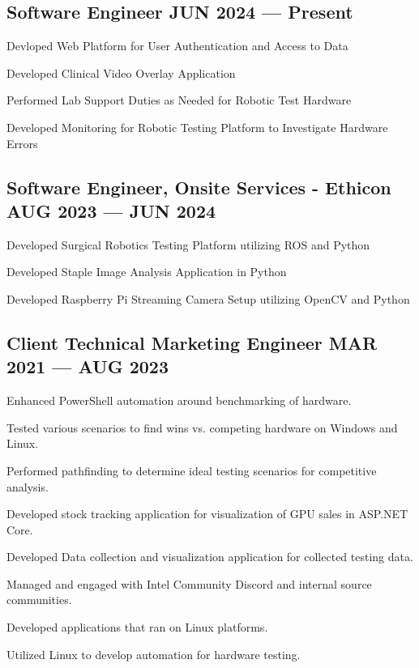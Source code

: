 \subsection{{Software Engineer \hfill JUN 2024 --- Present}}
\begin{zitemize}
\item Devloped Web Platform for User Authentication and Access to Data
\item Developed Clinical Video Overlay Application
\item Performed Lab Support Duties as Needed for Robotic Test Hardware
\item Developed Monitoring for Robotic Testing Platform to Investigate Hardware Errors
\end{zitemize}

\subsection{{Software Engineer, Onsite Services - Ethicon \hfill AUG 2023 --- JUN 2024}}
\begin{zitemize}
\item Developed Surgical Robotics Testing Platform utilizing ROS and Python
\item Developed Staple Image Analysis Application in Python
\item Developed Raspberry Pi Streaming Camera Setup utilizing OpenCV and Python
\end{zitemize}

\subsection{{Client Technical Marketing Engineer \hfill MAR 2021 --- AUG 2023}}
\begin{zitemize}
\item Enhanced PowerShell automation around benchmarking of hardware.
\item Tested various scenarios to find wins vs. competing hardware on Windows and Linux.
\item Performed pathfinding to determine ideal testing scenarios for competitive analysis.
\item Developed stock tracking application for visualization of GPU sales in ASP.NET Core.
\item Developed Data collection and visualization application for collected testing data.
\item Managed and engaged with Intel Community Discord and internal source communities.
\item Developed applications that ran on Linux platforms.
\item Utilized Linux to develop automation for hardware testing.
\end{zitemize}

